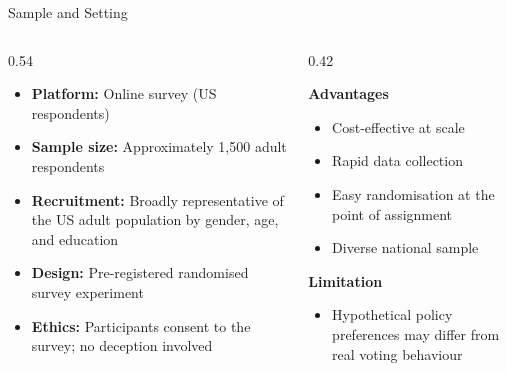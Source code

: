 \documentclass[aspectratio=169, 11pt]{beamer}
\begin{document}
\begin{frame}[t]{Sample and Setting}
\begin{columns}[T]
\begin{column}{0.54\textwidth}
\begin{itemize}
  \setlength\itemsep{0.5em}
  \item \textbf{Platform:} Online survey (US respondents)
  \item \textbf{Sample size:} Approximately 1,500 adult respondents
  \item \textbf{Recruitment:} Broadly representative of the US adult population by gender, age, and education
  \item \textbf{Design:} Pre-registered randomised survey experiment
  \item \textbf{Ethics:} Participants consent to the survey; no deception involved
\end{itemize}
\end{column}
\begin{column}{0.42\textwidth}
\begin{keybox}
\textbf{Advantages}
\begin{itemize}
  \setlength\itemsep{0.25em}
  \item Cost-effective at scale
  \item Rapid data collection
  \item Easy randomisation at the point of assignment
  \item Diverse national sample
\end{itemize}
\vspace{0.3em}
\textbf{Limitation}
\begin{itemize}
  \setlength\itemsep{0.25em}
  \item Hypothetical policy preferences may differ from real voting behaviour
\end{itemize}
\end{keybox}
\end{column}
\end{columns}
\end{frame}

\end{document}

